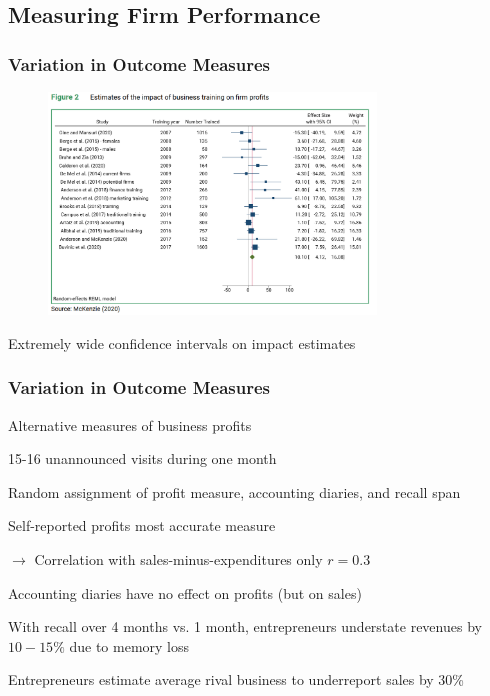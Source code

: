 \documentclass[hideothersubsections, usenames,dvipsnames,11pt]{beamer}
\newenvironment{itemize_2pt}{\itemize\addtolength{\itemsep}{2pt}}{\enditemize}
\newenvironment{enumerate_2pt}{\enumerate\addtolength{\itemsep}{2pt}}{\endenumerate}
\begin{document}
\subsection{Measuring Firm Performance}

\begin{frame}
\frametitle{Variation in Outcome Measures}
	
	\begin{figure}[htbp]
		\centering
		\includegraphics[width=23.5em]{pics/McK2020_profits.png}
		\label{McKenzie(2020): Profits2}
	\end{figure}	
	
\vspace{-1em}	
	
	\begin{itemize_2pt}
		\item \textcolor{bdf}{Extremely wide confidence intervals} on impact estimates
	\end{itemize_2pt}
\end{frame}


\begin{frame}
\frametitle{Variation in Outcome Measures}

Alternative measures of business profits \citep{deMel2009}
	\begin{itemize_2pt}
		\item 15-16 unannounced visits during one month
		\item Random assignment of profit measure, accounting diaries, and recall span
	\end{itemize_2pt}
		
	\pause	
		
	\vspace{0.5em}
		
	\begin{enumerate_2pt}
		\item \textcolor{bdf}{Self-reported profits most accurate measure}
		\item[] $\rightarrow$ Correlation with sales-minus-expenditures only $r=0.3$
		\item \textcolor{bdf}{Accounting diaries have no effect on profits} (but on sales)
		\item With recall over 4 months vs. 1 month, entrepreneurs \textcolor{bdf}{understate revenues by $10 - 15 \%$ due to memory loss} 
		\item Entrepreneurs estimate average rival business to \textcolor{bdf}{underreport sales by 30\%}
	\end{enumerate_2pt}	

\end{frame}
\end{document}
